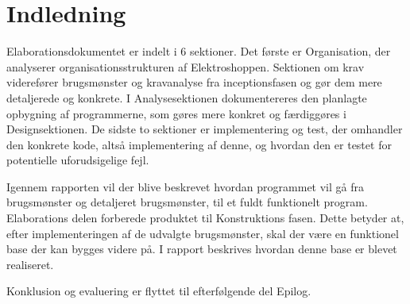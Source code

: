 \thispagestyle{fancy}
\section{Indledning}


Elaborationsdokumentet er indelt i  6 sektioner.  Det første er Organisation, der analyserer organisationsstrukturen af Elektroshoppen.  Sektionen om  krav viderefører brugsmønster og kravanalyse fra inceptionsfasen og gør dem mere detaljerede og konkrete. I Analysesektionen dokumentereres den planlagte opbygning af programmerne, som gøres mere konkret og færdiggøres i Designsektionen. De sidste to sektioner er implementering og test, der omhandler den konkrete  kode, altså implementering af denne, og hvordan den er testet for potentielle uforudsigelige fejl. 

Igennem rapporten vil der blive beskrevet hvordan programmet vil gå fra brugsmønster og detaljeret brugsmønster, til et fuldt funktionelt program. Elaborations delen forberede produktet til Konstruktions fasen. Dette betyder at, efter implementeringen af de udvalgte brugsmønster, skal der være en funktionel base der kan bygges videre på. I rapport beskrives hvordan denne base er blevet realiseret.

Konklusion og evaluering er flyttet til efterfølgende del Epilog.


